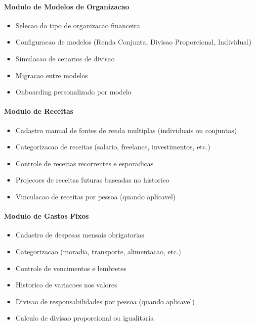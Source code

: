 \paragraph{Modulo de Modelos de Organizacao}
\begin{itemize}
    \item Selecao do tipo de organizacao financeira
    \item Configuracao de modelos (Renda Conjunta, Divisao Proporcional, Individual)
    \item Simulacao de cenarios de divisao
    \item Migracao entre modelos
    \item Onboarding personalizado por modelo
\end{itemize}

\paragraph{Modulo de Receitas}
\begin{itemize}
    \item Cadastro manual de fontes de renda multiplas (individuais ou conjuntas)
    \item Categorizacao de receitas (salario, freelance, investimentos, etc.)
    \item Controle de receitas recorrentes e esporadicas
    \item Projecoes de receitas futuras baseadas no historico
    \item Vinculacao de receitas por pessoa (quando aplicavel)
\end{itemize}

\paragraph{Modulo de Gastos Fixos}
\begin{itemize}
    \item Cadastro de despesas mensais obrigatorias
    \item Categorizacao (moradia, transporte, alimentacao, etc.)
    \item Controle de vencimentos e lembretes
    \item Historico de variacoes nos valores
    \item Divisao de responsabilidades por pessoa (quando aplicavel)
    \item Calculo de divisao proporcional ou igualitaria
\end{itemize}

